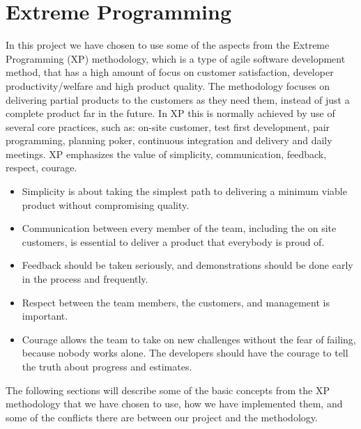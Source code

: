 
\section{Extreme Programming}
\label{sec:extreme_programming}

In this project we have chosen to use some of the aspects from the Extreme Programming (XP) methodology, which is a type of agile software development method, that has a high amount of focus on customer satisfaction, developer productivity/welfare and high product quality. The methodology focuses on delivering partial products to the customers as they need them, instead of just a complete product far in the future. In XP this is normally achieved by use of several core practices, such as: on-site customer, test first development, pair programming, planning poker, continuous integration and delivery and daily meetings. XP emphasizes the value of simplicity, communication, feedback, respect, courage. 

\begin{itemize}
	\item Simplicity is about taking the simplest path to delivering a minimum viable product without compromising quality. 
	\item Communication between every member of the team, including the on site customers, is essential to deliver a product that everybody is proud of. 
	\item Feedback should be taken seriously, and demonstrations should be done early in the process and frequently.
	\item Respect between the team members, the customers, and management is important.
	\item Courage allows the team to take on new challenges without the fear of failing, because nobody works alone. The developers should have the courage to tell the truth about progress and estimates. 
\end{itemize}

The following sections will describe some of the basic concepts from the XP methodology that we have chosen to use, how we have implemented them, and some of the conflicts there are between our project and the methodology.

